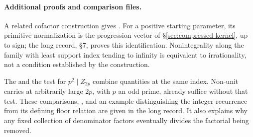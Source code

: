 \documentclass[11pt]{article}
\begin{document}
\paragraph{Additional proofs and comparison files.}

A related cofactor construction gives
.
For a positive starting parameter, its primitive normalization is the
progression vector of \S\ref{sec:compressed-kernel}, up to sign; the long
record, \S7, proves this identification. Nonintegrality along the family
with least support index tending to infinity is equivalent to irrationality,
not a condition established by the construction.

The
and the test for $p^2\mid Z_{2p}$ combine quantities at the same index.
Non-unit carries at arbitrarily large $2p$, with $p$ an odd prime, already
suffice without that test. These comparisons,
,
and an example distinguishing the integer recurrence from its defining
floor relation are given in the long record. It also explains why any fixed collection of
denominator factors eventually divides the factorial being removed.
\end{document}
